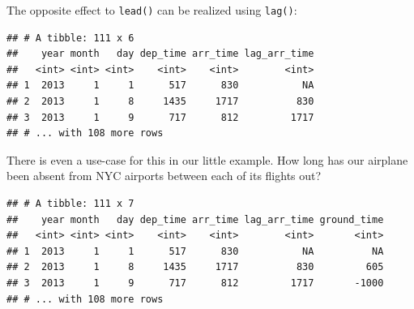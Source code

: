 \documentclass[]{book}
\newenvironment{Shaded}{}{}
\newcommand{\DataTypeTok}[1]{#1}
\newcommand{\KeywordTok}[1]{\textcolor[rgb]{0.00,0.00,1.00}{#1}}
\newcommand{\NormalTok}[1]{#1}
\newcommand{\OperatorTok}[1]{#1}
\newcommand{\StringTok}[1]{\textcolor[rgb]{0.00,0.50,0.50}{#1}}
\begin{document}
The opposite effect to \texttt{lead()} can be realized using \texttt{lag()}:

\begin{Shaded}
\end{Shaded}

\begin{verbatim}
## # A tibble: 111 x 6
##    year month   day dep_time arr_time lag_arr_time
##   <int> <int> <int>    <int>    <int>        <int>
## 1  2013     1     1      517      830           NA
## 2  2013     1     8     1435     1717          830
## 3  2013     1     9      717      812         1717
## # ... with 108 more rows
\end{verbatim}

There is even a use-case for this in our little example.
How long has our airplane been absent from NYC airports between each of its flights out?

\begin{Shaded}
\end{Shaded}

\begin{verbatim}
## # A tibble: 111 x 7
##    year month   day dep_time arr_time lag_arr_time ground_time
##   <int> <int> <int>    <int>    <int>        <int>       <int>
## 1  2013     1     1      517      830           NA          NA
## 2  2013     1     8     1435     1717          830         605
## 3  2013     1     9      717      812         1717       -1000
## # ... with 108 more rows
\end{verbatim}
\end{document}
